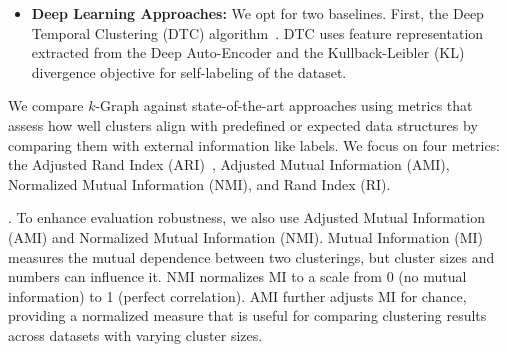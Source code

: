 \begin{itemize}[noitemsep, topsep=1pt, parsep=1pt, partopsep=1pt, leftmargin=0.5cm]
    \item \textbf{Deep Learning Approaches:} We opt for two baselines. First, the Deep Temporal Clustering (DTC) algorithm~\cite{DTCAlgorithm}. DTC uses feature representation extracted from the Deep Auto-Encoder and the Kullback-Leibler (KL) divergence objective for self-labeling of the dataset. 

\end{itemize}


\noindent{\bf [Metrics]} We compare $k$-Graph against state-of-the-art approaches using metrics that assess how well clusters align with predefined or expected data structures by comparing them with external information like labels.
We focus on four metrics: the Adjusted Rand Index (ARI)~\cite{steinley2004properties}, Adjusted Mutual Information (AMI), Normalized Mutual Information (NMI), and Rand Index (RI).


. To enhance evaluation robustness, we also use Adjusted Mutual Information (AMI) and Normalized Mutual Information (NMI). Mutual Information (MI) measures the mutual dependence between two clusterings, but cluster sizes and numbers can influence it. NMI normalizes MI to a scale from 0 (no mutual information) to 1 (perfect correlation). AMI further adjusts MI for chance, providing a normalized measure that is useful for comparing clustering results across datasets with varying cluster sizes.




